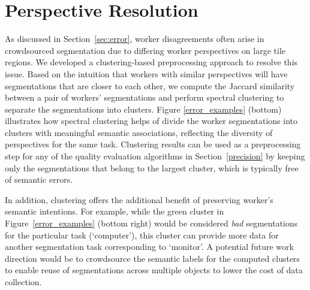 \vspace{-10pt}
\section{Perspective Resolution\label{perspective}}
As discussed in Section~\ref{sec:error}, worker disagreements often arise in crowdsourced segmentation due to differing worker perspectives on large tile regions. We developed a clustering-based preprocessing approach to resolve this issue.
Based on the intuition that workers with similar perspectives will have segmentations that are closer to each other, we compute the Jaccard similarity between a pair of workers' segmentations and perform spectral clustering to separate the segmentations into clusters. Figure \ref{error_examples} (bottom) illustrates how spectral clustering helps of divide the worker segmentations into clusters with meaningful semantic associations, reflecting the diversity of perspectives for the same task. Clustering results can be used as a preprocessing step for any of the quality evaluation algorithms in Section~\ref{precision} by keeping only the segmentations that belong to the largest cluster, which is typically free of semantic errors.
\par In addition, clustering offers the additional benefit of preserving worker's semantic intentions. For example, while the green cluster in Figure~\ref{error_examples} (bottom right) would be considered \textit{bad} segmentations for the particular task (`computer'), this cluster can provide more data for another segmentation task corresponding to `monitor'. A potential future work direction would be to crowdsource the semantic labels for the computed clusters to enable reuse of segmentations across multiple objects to lower the cost of data collection. %
